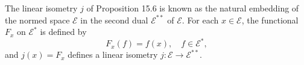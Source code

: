 The linear isometry $j$ of Proposition 15.6 is known as the natural embedding of the normed space $\mathcal{E}$ in the second dual $\mathcal{E}^{**}$ of $\mathcal{E}$. For each $x \in \mathcal{E}$, the functional $F_x$ on $\mathcal{E}^*$ is defined by
$$F_x(f) = f(x), \quad f \in \mathcal{E}^*,$$
and $j(x) = F_x$ defines a linear isometry $j: \mathcal{E} \to \mathcal{E}^{**}$.
